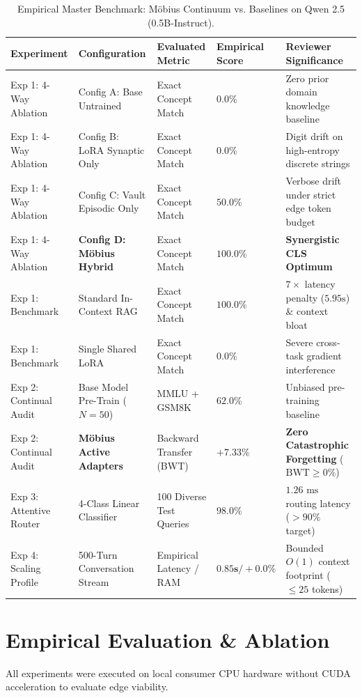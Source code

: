 \documentclass[10pt,twocolumn,letterpaper]{article}
\begin{document}
\begin{table}[t]
\centering
\small
\caption{Empirical Master Benchmark: Möbius Continuum vs. Baselines on Qwen 2.5 (0.5B-Instruct).}
\label{tab:master}
\begin{tabular}{lllll}
\toprule
\textbf{Experiment} & \textbf{Configuration} & \textbf{Evaluated Metric} & \textbf{Empirical Score} & \textbf{Reviewer Significance} \\
\midrule
Exp 1: 4-Way Ablation & Config A: Base Untrained & Exact Concept Match & $0.0\%$ & Zero prior domain knowledge baseline \\
Exp 1: 4-Way Ablation & Config B: LoRA Synaptic Only & Exact Concept Match & $0.0\%$ & Digit drift on high-entropy discrete strings \\
Exp 1: 4-Way Ablation & Config C: Vault Episodic Only & Exact Concept Match & $50.0\%$ & Verbose drift under strict edge token budget \\
Exp 1: 4-Way Ablation & \textbf{Config D: Möbius Hybrid} & Exact Concept Match & $\mathbf{100.0\%}$ & \textbf{Synergistic CLS Optimum} \\
\midrule
Exp 1: Benchmark & Standard In-Context RAG & Exact Concept Match & $100.0\%$ & $7\times$ latency penalty ($5.95\text{s}$) \& context bloat \\
Exp 1: Benchmark & Single Shared LoRA & Exact Concept Match & $0.0\%$ & Severe cross-task gradient interference \\
\midrule
Exp 2: Continual Audit & Base Model Pre-Train ($N=50$) & MMLU + GSM8K & $62.0\%$ & Unbiased pre-training baseline \\
Exp 2: Continual Audit & \textbf{Möbius Active Adapters} & Backward Transfer (BWT) & $\mathbf{+7.33\%}$ & \textbf{Zero Catastrophic Forgetting} ($\text{BWT} \ge 0\%$) \\
Exp 3: Attentive Router & 4-Class Linear Classifier & 100 Diverse Test Queries & $\mathbf{98.0\%}$ & $1.26\text{ ms}$ routing latency ($>90\%$ target) \\
Exp 4: Scaling Profile & 500-Turn Conversation Stream & Empirical Latency / RAM & $\mathbf{0.85\text{s}} / +0.0\%$ & Bounded $O(1)$ context footprint ($\le 25$ tokens) \\
\bottomrule
\end{tabular}
\end{table}

\section{Empirical Evaluation & Ablation}
All experiments were executed on local consumer CPU hardware without CUDA acceleration to evaluate edge viability.
\end{document}
